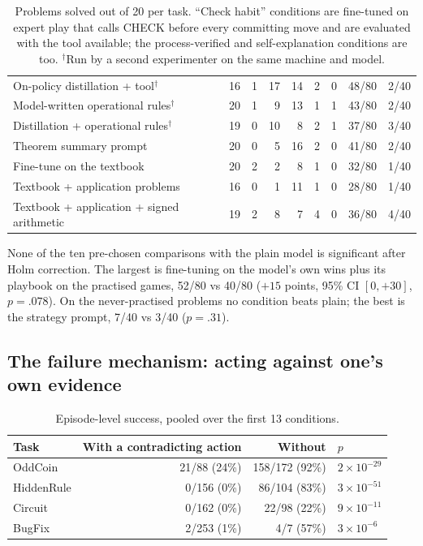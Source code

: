 \documentclass[11pt]{article}
\begin{document}
\begin{table}[h]
{\begin{tabular}{lrrrrrrrr}
On-policy distillation + tool$^\dagger$ & 16 & 1 & 17 & 14 & 2 & 0 & 48/80 & 2/40 \\
Model-written operational rules$^\dagger$ & 20 & 1 & 9 & 13 & 1 & 1 & 43/80 & 2/40 \\
Distillation + operational rules$^\dagger$ & 19 & 0 & 10 & 8 & 2 & 1 & 37/80 & 3/40 \\
Theorem summary prompt & 20 & 0 & 5 & 16 & 2 & 0 & 41/80 & 2/40 \\
Fine-tune on the textbook & 20 & 2 & 2 & 8 & 1 & 0 & 32/80 & 1/40 \\
Textbook + application problems & 16 & 0 & 1 & 11 & 1 & 0 & 28/80 & 1/40 \\
Textbook + application + signed arithmetic & 19 & 2 & 8 & 7 & 4 & 0 & 36/80 & 4/40 \\
\bottomrule
\end{tabular}}
\caption{Problems solved out of 20 per task. ``Check habit'' conditions are fine-tuned on expert play that calls
CHECK before every committing move and are evaluated with the tool available; the process-verified and
self-explanation conditions are too. $^\dagger$Run by a second experimenter on the same machine and model.}
\label{tab:main}
\end{table}

None of the ten pre-chosen comparisons with the plain model is significant after Holm correction. The largest is
fine-tuning on the model's own wins plus its playbook on the practised games, 52/80 vs 40/80 ($+15$ points, 95\% CI
$[0, +30]$, $p=.078$). On the never-practised problems no condition beats plain; the best is the strategy prompt,
7/40 vs 3/40 ($p=.31$).

\subsection{The failure mechanism: acting against one's own evidence}
\begin{table}[h]
\centering\small
\begin{tabular}{lrrl}
\toprule
Task & With a contradicting action & Without & $p$ \\
\midrule
OddCoin & 21/88 (24\%) & 158/172 (92\%) & $2\times10^{-29}$ \\
HiddenRule & 0/156 (0\%) & 86/104 (83\%) & $3\times10^{-51}$ \\
Circuit & 0/162 (0\%) & 22/98 (22\%) & $9\times10^{-11}$ \\
BugFix & 2/253 (1\%) & 4/7 (57\%) & $3\times10^{-6}$ \\
\bottomrule
\end{tabular}
\caption{Episode-level success, pooled over the first 13 conditions.}
\label{tab:mech}
\end{table}
\end{document}
